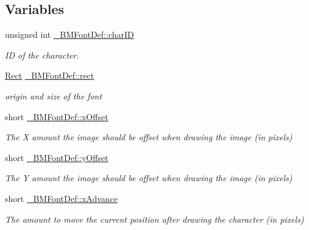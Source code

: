 \subsection*{Variables}
\begin{DoxyCompactItemize}
\item 
\mbox{\label{group__label_ga4be84ef9be4446878fff255b15e9e678}} 
unsigned int \hyperlink{group__label_ga4be84ef9be4446878fff255b15e9e678}{\+\_\+\+B\+M\+Font\+Def\+::char\+ID}
\begin{DoxyCompactList}\small\item\em ID of the character. \end{DoxyCompactList}\item 
\mbox{\label{group__label_ga9426c06ddd57097582d48bfb34ef02fa}} 
\hyperlink{classRect}{Rect} \hyperlink{group__label_ga9426c06ddd57097582d48bfb34ef02fa}{\+\_\+\+B\+M\+Font\+Def\+::rect}
\begin{DoxyCompactList}\small\item\em origin and size of the font \end{DoxyCompactList}\item 
\mbox{\label{group__label_gaf961a67faba7abff4c31ef69b32eaed4}} 
short \hyperlink{group__label_gaf961a67faba7abff4c31ef69b32eaed4}{\+\_\+\+B\+M\+Font\+Def\+::x\+Offset}
\begin{DoxyCompactList}\small\item\em The X amount the image should be offset when drawing the image (in pixels) \end{DoxyCompactList}\item 
\mbox{\label{group__label_gae0d9c0fc84b157abd9133b6bcddab2b7}} 
short \hyperlink{group__label_gae0d9c0fc84b157abd9133b6bcddab2b7}{\+\_\+\+B\+M\+Font\+Def\+::y\+Offset}
\begin{DoxyCompactList}\small\item\em The Y amount the image should be offset when drawing the image (in pixels) \end{DoxyCompactList}\item 
\mbox{\label{group__label_gaf8a9e2733f5f1fcb8a3631b3886d6703}} 
short \hyperlink{group__label_gaf8a9e2733f5f1fcb8a3631b3886d6703}{\+\_\+\+B\+M\+Font\+Def\+::x\+Advance}
\begin{DoxyCompactList}\small\item\em The amount to move the current position after drawing the character (in pixels) \end{DoxyCompactList}\item 

\end{DoxyCompactItemize}

